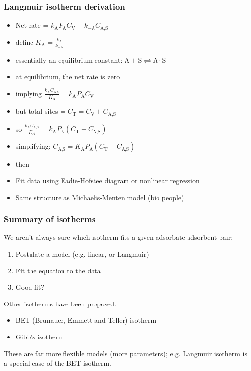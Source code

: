 \begin{frame}\frametitle{Langmuir isotherm derivation}
	\begin{itemize}
		\item	Net rate = $k_\text{A} P_\text{A} C_\text{V} - k_{-\text{A}} C_\text{A,S}$  
		\item	define $K_\text{A} = \displaystyle\frac{k_\text{A}}{k_{-\text{A}}}$
		\item	essentially an equilibrium constant: $\text{A} + \text{S} \rightleftharpoons \text{A}\cdot \text{S}$		
		\item	at equilibrium, the net rate is zero 
		\pause
		\item	implying $\displaystyle\frac{k_\text{A}C_\text{A,S}}{K_\text{A}} = k_\text{A} P_\text{A} C_\text{V}$  
		\item	but total sites = $C_\text{T} = C_\text{V} + C_\text{A,S}$
		\item	so $\displaystyle\frac{k_\text{A}C_\text{A,S}}{K_A} = k_\text{A} P_\text{A} \left(C_\text{T} -  C_\text{A,S}\right)$  
		\item	simplifying: $C_\text{A,S} = K_\text{A} P_\text{A} \left(C_\text{T} -  C_\text{A,S}\right)$  
		\item	then 
		\item	Fit data using \href{http://en.wikipedia.org/wiki/Eadie\%E2\%80\%93Hofstee\_plot}{Eadie-Hofstee diagram} or nonlinear regression
		\item	Same structure as Michaelis-Menten model (bio people)
	\end{itemize}
\end{frame}

\begin{frame}\frametitle{Summary of isotherms}
	We aren't always sure which isotherm fits a given adsorbate-adsorbent pair:
	\begin{enumerate}
		\item	Postulate a model (e.g. linear, or Langmuir)
		\item	Fit the equation to the data
		\item	Good fit? 
	\end{enumerate}
	
	\vspace{24pt}
	Other isotherms have been proposed:
	\begin{itemize}
		\item	BET (Brunauer, Emmett and Teller) isotherm
		\item	Gibb's isotherm
	\end{itemize}
	
	These are far more flexible models (more parameters); e.g. Langmuir isotherm is a special case of the BET isotherm.
\end{frame}


